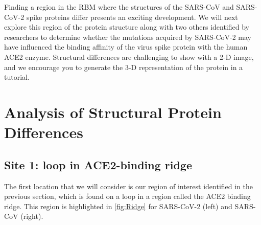 Finding a region in the RBM where the structures of the SARS-CoV and SARS-CoV-2 spike proteins differ presents an exciting development. We will next explore this region of the protein structure along with two others identified by researchers to determine whether the mutations acquired by SARS-CoV-2 may have influenced the binding affinity of the virus spike protein with the human ACE2 enzyme. Structural differences are challenging to show with a 2-D image, and we encourage you to generate the 3-D representation of the protein in a tutorial.\\

\FloatBarrier
{}
\section{Analysis of Structural Protein Differences}
\label{sec:structural_differences}

\subsection{Site 1: loop in ACE2-binding ridge}

The first location that we will consider is our region of interest identified in the previous section, which is found on a loop in a region called the ACE2 binding ridge. This region is highlighted in \autoref{fig:Ridge} for SARS-CoV-2 (left) and SARS-CoV (right).

